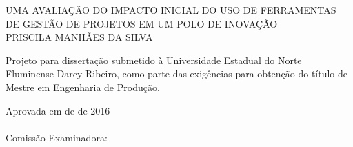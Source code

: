 \begin{folhadeaprovacao}
    \setlength{\ABNTsignthickness}{0.4pt}
    \setlength{\ABNTsignwidth}{15cm}
    \setlength{\ABNTsignskip}{0.9cm}
    \begin{center}
       {\large UMA AVALIAÇÃO DO IMPACTO INICIAL DO USO DE FERRAMENTAS DE GESTÃO DE PROJETOS EM UM POLO DE INOVAÇÃO} \\ [3.5cm]
       {\large PRISCILA MANHÃES DA SILVA} \\ [1.5cm]
        \hspace{.45\textwidth} %
        \begin{minipage}{0.5\textwidth}
        \begin{espacosimples}
        Projeto para dissertação submetido à Universidade Estadual do Norte Fluminense Darcy Ribeiro, como parte das exigências para obtenção do título de Mestre em Engenharia de Produção.
        \end{espacosimples}
        \end{minipage}
    \end{center}
    {\normalsize Aprovada em \underline{\hspace{.2in}} de \underline{\hspace{.8in}} de 2016} \\\\
    {\normalsize Comissão Examinadora: }
    \bigbreak
    \bigbreak
    \bigbreak
\end{folhadeaprovacao}
